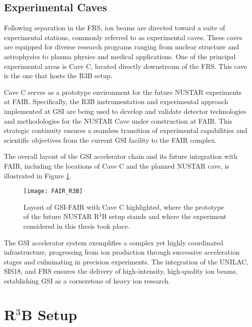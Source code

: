 \subsection{Experimental Caves}

Following separation in the \gls{FRS}, ion beams are directed toward a suite of experimental stations, commonly referred to as experimental caves. These caves are equipped for diverse research programs ranging from nuclear structure and astrophysics to plasma physics and medical applications. One of the principal experimental areas is Cave C, located directly downstream of the \gls{FRS}. This cave is the one that hosts the \gls{R3B} setup.

Cave C serves as a prototype environment for the future NUSTAR experiments at \gls{FAIR}. Specifically, the \gls{R3B} instrumentation and experimental approach implemented at GSI are being used to develop and validate detector technologies and methodologies for the NUSTAR Cave under construction at \gls{FAIR}. This strategic continuity ensures a seamless transition of experimental capabilities and scientific objectives from the current GSI facility to the \gls{FAIR} complex.

The overall layout of the GSI accelerator chain and its future integration with \gls{FAIR}, including the locations of Cave C and the planned NUSTAR cave, is illustrated in Figure \ref{fig:GSI_FAIR_R3B}.

\begin{figure}
	\centering
	\texttt{[image: FAIR\_R3B]}
	\caption[Layout of GSI-FAIR with Cave C highlighted]{Layout of GSI-FAIR with Cave C highlighted, where the prototype of the future NUSTAR R$^3$B setup stands and where the experiment considered in this thesis took place.}
	\label{fig:GSI_FAIR_R3B}
\end{figure}



The GSI accelerator system exemplifies a complex yet highly coordinated infrastructure, progressing from ion production through successive acceleration stages and culminating in precision experiments. The integration of the UNILAC, SIS18, and \gls{FRS} ensures the delivery of high-intensity, high-quality ion beams, establishing GSI as a cornerstone of heavy ion research.


\section{R$^3$B Setup}

